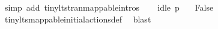 \begin{isabellebody}
\ {\isacharparenleft}{\kern0pt}simp\ add{\isacharcolon}{\kern0pt}\ tiny{\isacharunderscore}{\kern0pt}lts{\isachardot}{\kern0pt}tran{\isacharunderscore}{\kern0pt}mappable{\isachardot}{\kern0pt}intros{\isacharparenright}{\kern0pt}\isanewline
\isanewline
\ \ \isamarkupfalse%
\ {\isacartoucheopen}idle\ p{}\ {\isasymemptyset}{\isacartoucheclose}\ \isamarkupfalse%
\ False\ \isanewline
\ \ \ \ \isamarkupfalse%
\ tiny{\isacharunderscore}{\kern0pt}lts{\isacharunderscore}{\kern0pt}mappable{\isachardot}{\kern0pt}initial{\isacharunderscore}{\kern0pt}actions{\isacharunderscore}{\kern0pt}def\ \isamarkupfalse%
\ blast\isanewline
{}\isamarkupfalse%
\isanewline
%
\endisatagvisible
{\isafoldvisible}%
%
\isadelimvisible
%
\endisadelimvisible
%
\isadelimtheory
%
\endisadelimtheory
%
\isatagtheory
%
\endisatagtheory
{\isafoldtheory}%
%
\isadelimtheory
%
\endisadelimtheory
%
\end{isabellebody}%
\endinput
